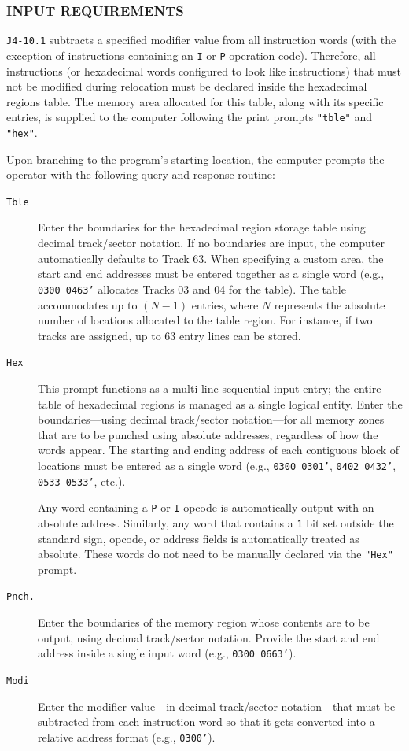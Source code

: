 \subsubsection*{INPUT REQUIREMENTS}
\texttt{J4-10.1} subtracts a specified modifier value from all instruction words (with the exception of instructions containing an \texttt{I} or \texttt{P} operation code). Therefore, all instructions (or hexadecimal words configured to look like instructions) that must not be modified during relocation must be declared inside the hexadecimal regions table. The memory area allocated for this table, along with its specific entries, is supplied to the computer following the print prompts \texttt{"tble"} and \texttt{"hex"}.

Upon branching to the program's starting location, the computer prompts the operator with the following query-and-response routine:

\begin{description}
    \item[\texttt{Tble}] Enter the boundaries for the hexadecimal region storage table using decimal track/sector notation. If no boundaries are input, the computer automatically defaults to Track 63. When specifying a custom area, the start and end addresses must be entered together as a single word (e.g., \texttt{0300 0463'} allocates Tracks 03 and 04 for the table). The table accommodates up to $(N - 1)$ entries, where $N$ represents the absolute number of locations allocated to the table region. For instance, if two tracks are assigned, up to 63 entry lines can be stored.

    \item[\texttt{Hex}] This prompt functions as a multi-line sequential input entry; the entire table of hexadecimal regions is managed as a single logical entity. Enter the boundaries—using decimal track/sector notation—for all memory zones that are to be punched using absolute addresses, regardless of how the words appear. The starting and ending address of each contiguous block of locations must be entered as a single word (e.g., \texttt{0300 0301'}, \texttt{0402 0432'}, \texttt{0533 0533'}, etc.).
    
    Any word containing a \texttt{P} or \texttt{I} opcode is automatically output with an absolute address. Similarly, any word that contains a \texttt{1} bit set outside the standard sign, opcode, or address fields is automatically treated as absolute. These words do not need to be manually declared via the \texttt{"Hex"} prompt.

    \item[\texttt{Pnch.}] Enter the boundaries of the memory region whose contents are to be output, using decimal track/sector notation. Provide the start and end address inside a single input word (e.g., \texttt{0300 0663'}).

    \item[\texttt{Modi}] Enter the modifier value—in decimal track/sector notation—that must be subtracted from each instruction word so that it gets converted into a relative address format (e.g., \texttt{0300'}).
\end{description}

